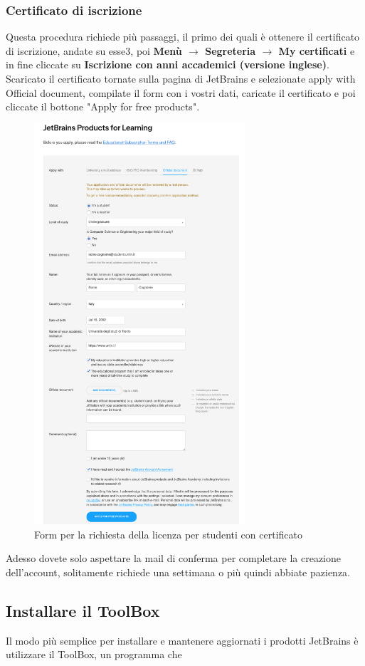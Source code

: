         \subsubsection{Certificato di iscrizione}
            Questa procedura richiede più passaggi, il primo dei quali è ottenere il certificato di iscrizione, andate su esse3, poi \textbf{Menù $\rightarrow$ Segreteria $\rightarrow$ My certificati} e in fine 
            cliccate su \textbf{Iscrizione con anni accademici (versione inglese)}. Scaricato il certificato tornate sulla pagina di JetBrains e selezionate apply with Official document, 
            compilate il form con i vostri dati, caricate il certificato e poi cliccate il bottone "Apply for free products".
            \begin{figure}[H]
                \centering
                \graphicspath{{src/capitoli/04/img/}}
                \includegraphics[width=0.7\textwidth]{form-studente-cert.png}
                \caption{Form per la richiesta della licenza per studenti con certificato}
                \label{fig:Form per la richiesta della licenza per studenti con certificato}
            \end{figure}
            Adesso dovete solo aspettare la mail di conferma per completare la creazione dell'account, solitamente richiede una settimana o più quindi abbiate pazienza.
    
    \subsection{Installare il ToolBox}
        Il modo più semplice per installare e mantenere aggiornati i prodotti JetBrains è utilizzare il ToolBox, un programma che 